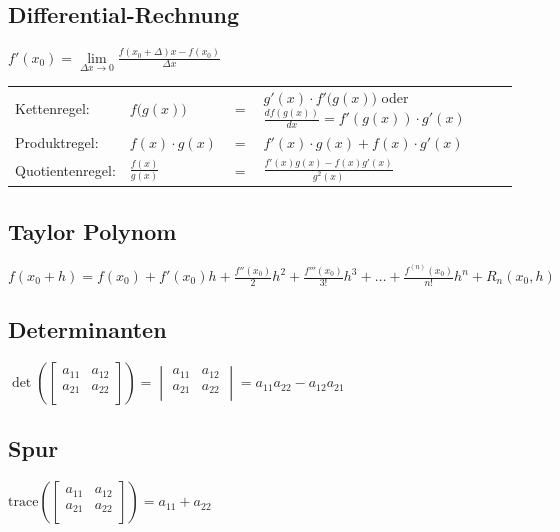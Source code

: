 \documentclass[a4paper]{scrartcl}
\begin{document}
	\subsection{Differential-Rechnung}
	  $f'(x_0)=\lim\limits_{\Delta x\rightarrow 0}
	  \frac{f(x_0+\Delta)x-f(x_0)}{\Delta x}$\\
		\begin{tabular}{llll}
			Kettenregel:	& $f\big(g(x)\big)$ &$=$ & $g'(x)\cdot f'\big(g(x)\big)$
			oder $\frac{d f(g(x))}{dx} = f'(g(x)) \cdot g'(x)$\\[0.1cm] Produktregel:	&
			$f(x)\cdot g(x)$ &$=$ & $f'(x)\cdot g(x) + f(x)\cdot g'(x)$\\[0.1cm] Quotientenregel:& $\frac{f(x)}{g(x)}$ &$=$ & $\frac{f'(x)g(x)-f(x)g'(x)}{g^2(x)}$\\
		\end{tabular}
		
		
	\subsection{Taylor Polynom}
		$f(x_0+h)=f(x_0) + f'(x_0)h + \frac{f''(x_0)}{2}h^2 + \frac{f'''(x_0)}{3!}h^3 + \ldots + \frac{f^{(n)}(x_0)}{n!}h^n + R_n(x_0, h)$

	\subsection{Determinanten}
		$\det\left(
		\begin{bmatrix}
			a_{11}&a_{12}\\
			a_{21}&a_{22}\\
		\end{bmatrix}\right)=
		\begin{vmatrix}
			a_{11}&a_{12}\\
			a_{21}&a_{22}\\
		\end{vmatrix}=a_{11}a_{22}-a_{12}a_{21}$
		
	\subsection{Spur}
			$\text{trace}\left(
		\begin{bmatrix}
			a_{11}&a_{12}\\
			a_{21}&a_{22}\\
		\end{bmatrix}\right)=
		a_{11} + a_{22}$\\
\end{document}
